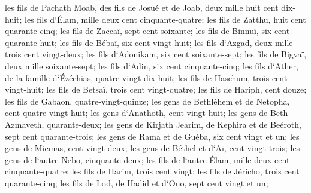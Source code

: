 \verse les fils de Pachath Moab, des fils de Josué et de Joab, deux mille huit cent dix-huit; 
\verse les fils d`Élam, mille deux cent cinquante-quatre; 
\verse les fils de Zatthu, huit cent quarante-cinq; 
\verse les fils de Zaccaï, sept cent soixante; 
\verse les fils de Binnuï, six cent quarante-huit; 
\verse les fils de Bébaï, six cent vingt-huit; 
\verse les fils d`Azgad, deux mille trois cent vingt-deux; 
\verse les fils d`Adonikam, six cent soixante-sept; 
\verse les fils de Bigvaï, deux mille soixante-sept; 
\verse les fils d`Adin, six cent cinquante-cinq; 
\verse les fils d`Ather, de la famille d`Ézéchias, quatre-vingt-dix-huit; 
\verse les fils de Haschum, trois cent vingt-huit; 
\verse les fils de Betsaï, trois cent vingt-quatre; 
\verse les fils de Hariph, cent douze; 
\verse les fils de Gabaon, quatre-vingt-quinze; 
\verse les gens de Bethléhem et de Netopha, cent quatre-vingt-huit; 
\verse les gens d`Anathoth, cent vingt-huit; 
\verse les gens de Beth Azmaveth, quarante-deux; 
\verse les gens de Kirjath Jearim, de Kephira et de Beéroth, sept cent quarante-trois; 
\verse les gens de Rama et de Guéba, six cent vingt et un; 
\verse les gens de Micmas, cent vingt-deux; 
\verse les gens de Béthel et d`Aï, cent vingt-trois; 
\verse les gens de l`autre Nebo, cinquante-deux; 
\verse les fils de l`autre Élam, mille deux cent cinquante-quatre; 
\verse les fils de Harim, trois cent vingt; 
\verse les fils de Jéricho, trois cent quarante-cinq; 
\verse les fils de Lod, de Hadid et d`Ono, sept cent vingt et un; 
